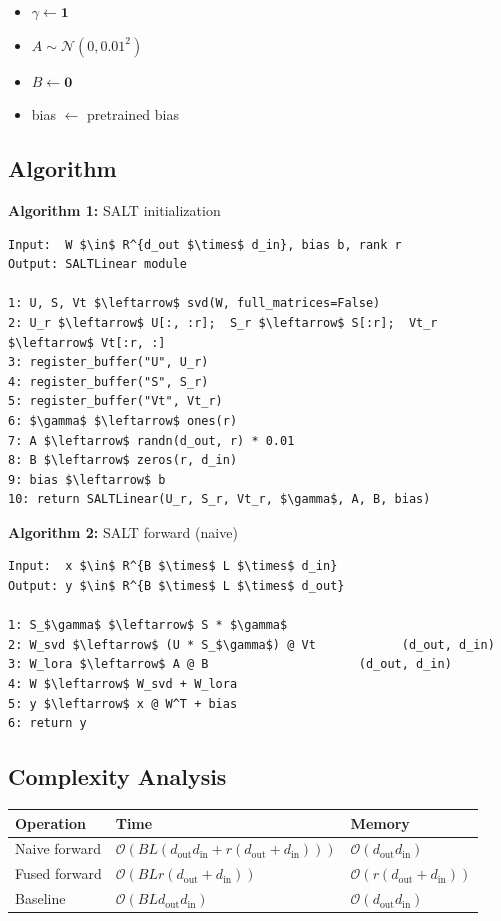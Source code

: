 \begin{itemize}
\item $\gamma \leftarrow \mathbf{1}$
\item $A \sim \mathcal{N}(0, 0.01^2)$
\item $B \leftarrow \mathbf{0}$
\item bias $\leftarrow$ pretrained bias

\end{itemize}
\subsection{Algorithm}

\textbf{Algorithm 1:} SALT initialization
\begin{lstlisting}
Input:  W $\in$ R^{d_out $\times$ d_in}, bias b, rank r
Output: SALTLinear module

1: U, S, Vt $\leftarrow$ svd(W, full_matrices=False)
2: U_r $\leftarrow$ U[:, :r];  S_r $\leftarrow$ S[:r];  Vt_r $\leftarrow$ Vt[:r, :]
3: register_buffer("U", U_r)
4: register_buffer("S", S_r)
5: register_buffer("Vt", Vt_r)
6: $\gamma$ $\leftarrow$ ones(r)
7: A $\leftarrow$ randn(d_out, r) * 0.01
8: B $\leftarrow$ zeros(r, d_in)
9: bias $\leftarrow$ b
10: return SALTLinear(U_r, S_r, Vt_r, $\gamma$, A, B, bias)
\end{lstlisting}

\textbf{Algorithm 2:} SALT forward (naive)
\begin{lstlisting}
Input:  x $\in$ R^{B $\times$ L $\times$ d_in}
Output: y $\in$ R^{B $\times$ L $\times$ d_out}

1: S_$\gamma$ $\leftarrow$ S * $\gamma$
2: W_svd $\leftarrow$ (U * S_$\gamma$) @ Vt            (d_out, d_in)
3: W_lora $\leftarrow$ A @ B                     (d_out, d_in)
4: W $\leftarrow$ W_svd + W_lora
5: y $\leftarrow$ x @ W^T + bias
6: return y
\end{lstlisting}

\subsection{Complexity Analysis}

\begin{table}[H]
\centering
\small
\begin{tabular}{lll}
\toprule
\textbf{Operation} & \textbf{Time} & \textbf{Memory} \\
\midrule
Naive forward & $\mathcal{O}(BL(d_\text{out} d_\text{in} + r(d_\text{out} + d_\text{in})))$ & $\mathcal{O}(d_\text{out} d_\text{in})$ \\
Fused forward & $\mathcal{O}(BL r (d_\text{out} + d_\text{in}))$ & $\mathcal{O}(r(d_\text{out} + d_\text{in}))$ \\
Baseline & $\mathcal{O}(BL d_\text{out} d_\text{in})$ & $\mathcal{O}(d_\text{out} d_\text{in})$ \\
\bottomrule
\end{tabular}
\end{table}

